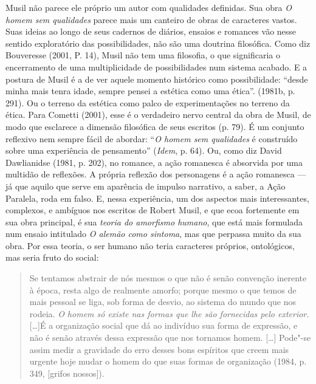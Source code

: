Musil não parece ele próprio um autor com qualidades definidas. Sua obra
\emph{O homem sem qualidades} parece mais um canteiro de obras de
caracteres vastos. Suas ideias ao longo de seus cadernos de diários,
ensaios e romances vão nesse sentido exploratório das possibilidades,
não são uma doutrina filosófica. Como diz Bouveresse (2001, P. 14),
Musil não tem uma filosofia, o que significaria o encerramento de uma
multiplicidade de possibilidades num sistema acabado. E a postura de
Musil é a de ver aquele momento histórico como possibilidade: ``desde
minha mais tenra idade, sempre pensei a estética como uma ética''.
(1981b, p. 291). Ou o terreno da estética como palco de experimentações
no terreno da ética. Para Cometti (2001), esse é o verdadeiro nervo
central da obra de Musil, de modo que esclarece a dimensão filosófica de
seus escritos (p. 79). É um conjunto reflexivo nem sempre fácil de
abordar: ``\emph{O homem sem qualidades} é construído sobre uma
experiência de pensamento'' (\emph{Idem}, p. 64). Ou, como diz David
Dawlianidse (1981, p. 202), no romance, a ação romanesca é absorvida por
uma multidão de reflexões. A própria reflexão dos personagens é a ação
romanesca --- já que aquilo que serve em aparência de impulso narrativo,
a saber, a Ação Paralela, roda em falso. E, nessa experiência, um dos
aspectos mais interessantes, complexos, e ambíguos nos escritos de
Robert Musil, e que ecoa fortemente em sua obra principal, é sua
\emph{teoria do amorfismo humano}, que está mais formulada num ensaio
intitulado \emph{O alemão como sintoma}, mas que perpassa muito da sua
obra. Por essa teoria, o ser humano não teria caracteres próprios,
ontológicos, mas seria fruto do social:

\begin{quote}
Se tentamos abstrair de nós mesmos o que não é senão convenção inerente
à época, resta algo de realmente amorfo; porque mesmo o que temos de
mais pessoal se liga, sob forma de desvio, ao sistema do mundo que nos
rodeia. \emph{O homem só existe nas formas que lhe são fornecidas pelo
exterior.} [\ldots{}]É a organização social que dá ao indivíduo sua forma
de expressão, e não é senão através dessa expressão que nos tornamos
homem. [\ldots{}] Pode"-se assim medir a gravidade do erro desses
bons espíritos que creem mais urgente hoje mudar o homem do que suas
formas de organização (1984, p. 349, [grifos nossos]).
\end{quote}

